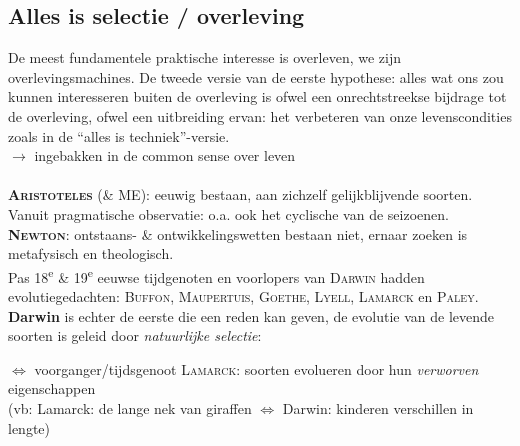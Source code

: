 \subsection{Alles is selectie / overleving}
De meest fundamentele praktische interesse is overleven, we zijn overlevingsmachines. De tweede versie van de eerste hypothese: alles wat ons zou kunnen interesseren buiten de overleving is ofwel een onrechtstreekse bijdrage tot de overleving, ofwel een uitbreiding ervan: het verbeteren van onze levenscondities zoals in de ``alles is techniek''-versie.
\\
$\rightarrow$ ingebakken in de common sense over leven
\\
\\
\textsc{\textbf{Aristoteles}} (\& ME): eeuwig bestaan, aan zichzelf gelijkblijvende soorten.
\\ Vanuit pragmatische observatie: o.a. ook het cyclische van de seizoenen.
\\
\textbf{\textsc{Newton}}: ontstaans- \& ontwikkelingswetten bestaan niet, ernaar zoeken is metafysisch en theologisch.
\\ Pas 18\textsuperscript{e} \& 19\textsuperscript{e} eeuwse tijdgenoten en voorlopers van \textsc{Darwin} hadden evolutiegedachten: \textsc{Buffon}, \textsc{Maupertuis}, \textsc{Goethe}, \textsc{Lyell}, \textsc{Lamarck} en \textsc{Paley}.
\\ \textbf{Darwin} is echter de eerste die een reden kan geven, de evolutie van de levende soorten is geleid door \emph{natuurlijke selectie}:
\\
\begin{center}
\end{center}
$\Leftrightarrow$ voorganger/tijdsgenoot \textsc{Lamarck}: soorten evolueren door hun \emph{verworven} eigenschappen \\ \indent(vb: Lamarck: de lange nek van giraffen $\Leftrightarrow$ Darwin: kinderen verschillen in lengte)

